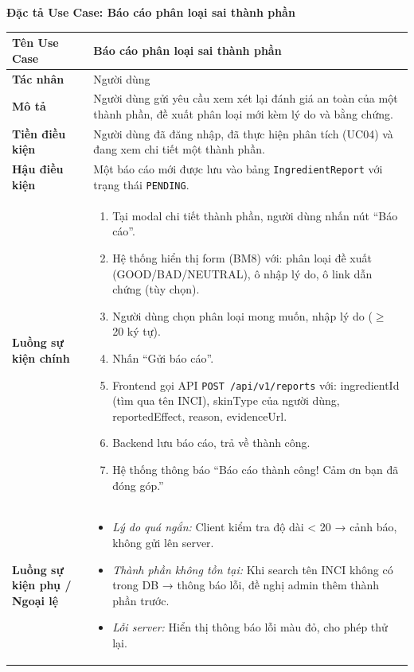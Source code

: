 \documentclass[12pt,a4paper]{article}
\begin{document}
\vspace{0.5cm}
\textbf{Đặc tả Use Case: Báo cáo phân loại sai thành phần}

\begin{center}
\renewcommand{\arraystretch}{1.4}
\begin{tabular}{|p{4cm}|p{10cm}|}
\hline
\rowcolor{blue!15}
\textbf{Tên Use Case} & \textbf{Báo cáo phân loại sai thành phần} \\ \hline
\textbf{Tác nhân} & Người dùng \\ \hline
\textbf{Mô tả} & Người dùng gửi yêu cầu xem xét lại đánh giá an toàn của một thành phần, đề xuất phân loại mới kèm lý do và bằng chứng. \\ \hline
\textbf{Tiền điều kiện} & Người dùng đã đăng nhập, đã thực hiện phân tích (UC04) và đang xem chi tiết một thành phần. \\ \hline
\textbf{Hậu điều kiện} & Một báo cáo mới được lưu vào bảng \texttt{IngredientReport} với trạng thái \texttt{PENDING}. \\ \hline
\textbf{Luồng sự kiện chính} & 
\begin{enumerate}
    \item Tại modal chi tiết thành phần, người dùng nhấn nút “Báo cáo”.
    \item Hệ thống hiển thị form (BM8) với: phân loại đề xuất (GOOD/BAD/NEUTRAL), ô nhập lý do, ô link dẫn chứng (tùy chọn).
    \item Người dùng chọn phân loại mong muốn, nhập lý do ($\ge$ 20 ký tự).
    \item Nhấn “Gửi báo cáo”.
    \item Frontend gọi API \texttt{POST /api/v1/reports} với: ingredientId (tìm qua tên INCI), skinType của người dùng, reportedEffect, reason, evidenceUrl.
    \item Backend lưu báo cáo, trả về thành công.
    \item Hệ thống thông báo “Báo cáo thành công! Cảm ơn bạn đã đóng góp.”
\end{enumerate} \\ \hline
\textbf{Luồng sự kiện phụ / Ngoại lệ} & 
\begin{itemize}
    \item \textit{Lý do quá ngắn:} Client kiểm tra độ dài < 20 → cảnh báo, không gửi lên server.
    \item \textit{Thành phần không tồn tại:} Khi search tên INCI không có trong DB → thông báo lỗi, đề nghị admin thêm thành phần trước.
    \item \textit{Lỗi server:} Hiển thị thông báo lỗi màu đỏ, cho phép thử lại.
\end{itemize} \\ \hline
\end{tabular}
\end{center}
\end{document}
